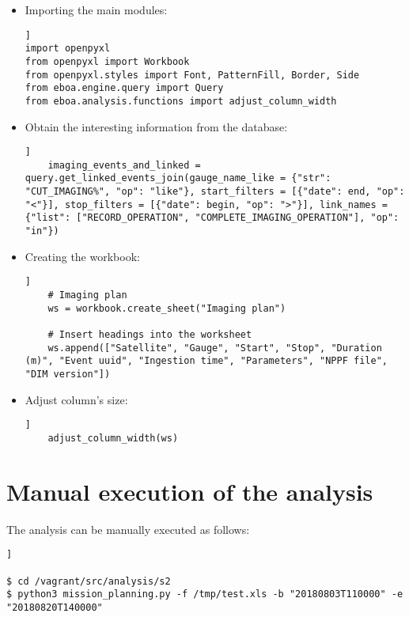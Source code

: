 \begin{itemize}
\item Importing the main modules:
\begin{lstlisting}[breaklines=true, style=python]]
import openpyxl
from openpyxl import Workbook
from openpyxl.styles import Font, PatternFill, Border, Side
from eboa.engine.query import Query
from eboa.analysis.functions import adjust_column_width
\end{lstlisting}
\item Obtain the interesting information from the database:
\begin{lstlisting}[breaklines=true, style=python]]
    imaging_events_and_linked = query.get_linked_events_join(gauge_name_like = {"str": "CUT_IMAGING%", "op": "like"}, start_filters = [{"date": end, "op": "<"}], stop_filters = [{"date": begin, "op": ">"}], link_names = {"list": ["RECORD_OPERATION", "COMPLETE_IMAGING_OPERATION"], "op": "in"})
\end{lstlisting}
\item Creating the workbook:
\begin{lstlisting}[breaklines=true, style=python]]
    # Imaging plan
    ws = workbook.create_sheet("Imaging plan")

    # Insert headings into the worksheet
    ws.append(["Satellite", "Gauge", "Start", "Stop", "Duration (m)", "Event uuid", "Ingestion time", "Parameters", "NPPF file", "DIM version"])
\end{lstlisting}
\item Adjust column's size:
\begin{lstlisting}[breaklines=true, style=python]]
    adjust_column_width(ws)
\end{lstlisting}
\end{itemize}

\section{Manual execution of the analysis}

The analysis can be manually executed as follows:

\begin{lstlisting}[breaklines=true, style=bash]]

$ cd /vagrant/src/analysis/s2
$ python3 mission_planning.py -f /tmp/test.xls -b "20180803T110000" -e "20180820T140000"

\end{lstlisting}
